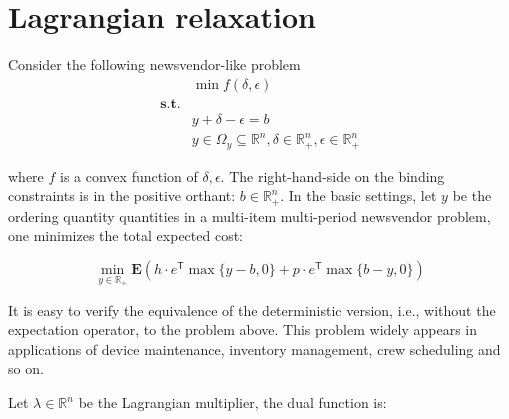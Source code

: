 

\usepackage{svg}

%
%
\author{Chuwen}
\date{\today}


\title{}





{
\setcounter{tocdepth}{3}
\tableofcontents
}
\hypertarget{lagrangian-relaxation}{%
  \section{Lagrangian relaxation}\label{lagrangian-relaxation}}

Consider the following newsvendor-like problem
\begin{equation}\label{eq:primal}
  \begin{aligned}
                  & \min f(\delta, \epsilon)                                                                       \\
    \mathbf{s.t.} &                                                                                                \\
                  & y + \delta - \epsilon = b                                                                      \\
                  & y \in \Omega_y \subseteq \mathbb{R}^n, \delta \in \mathbb{R}^n_+ , \epsilon \in \mathbb{R}^n_+
  \end{aligned}
\end{equation}

where \(f\) is a convex function of \(\delta, \epsilon\). The
right-hand-side on the binding constraints is in the positive orthant:
\(b \in \mathbb R_+^n\).  In the basic
settings, let \(y\) be the ordering quantity quantities in a multi-item multi-period
newsvendor problem, one minimizes the total expected cost:

\[\min_{y \in \mathbb R_+} \mathbf E\left(h\cdot e^\mathsf{T} \max\{y - b,  0\} + p \cdot e^\mathsf{T} \max\{b - y,  0\}\right)\]

It is easy to verify the equivalence of the deterministic version, i.e., without the expectation operator, to the problem above. This problem widely appears in applications of
device maintenance, inventory management, crew scheduling and so on.

Let \(\lambda\in\mathbb{R}^n\) be the Lagrangian multiplier, the dual
function is:

